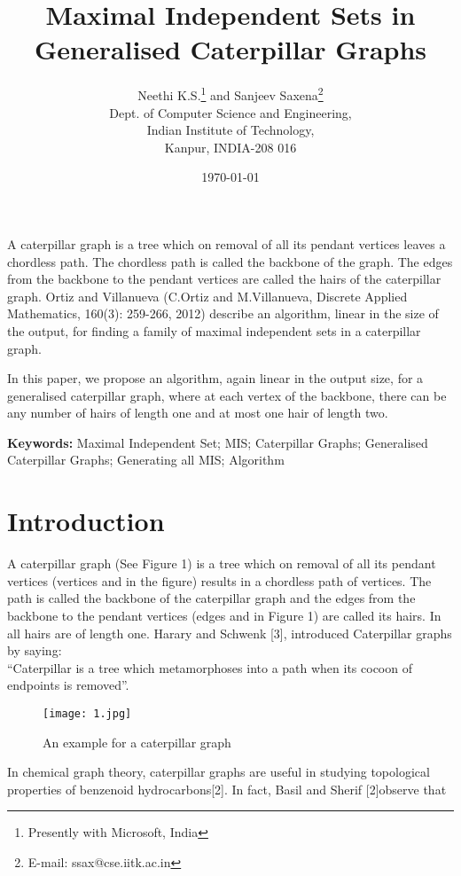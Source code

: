 \documentclass[10pt]{article}
\title{Maximal Independent Sets in Generalised Caterpillar Graphs}
\author{Neethi K.S.\thanks{Presently with Microsoft, India}
{\normalsize{and }} Sanjeev Saxena\thanks{E-mail: ssax@cse.iitk.ac.in}\\
Dept. of Computer Science and Engineering,\\ Indian Institute of
Technology,\\ Kanpur, INDIA-208 016}
\date{\today}
\begin{document}
\maketitle

\subsection*{}


A caterpillar graph is a tree which on removal of all its pendant
vertices leaves a chordless path. The chordless path is called the
backbone of the graph.  The edges from the backbone to the pendant
vertices are called the hairs of the caterpillar graph. Ortiz and
Villanueva (C.Ortiz and M.Villanueva, Discrete Applied Mathematics,
160(3): 259-266, 2012) describe an algorithm, linear in the size of the
output, for finding a family of maximal independent sets in a caterpillar
graph.

In this paper, we propose an algorithm, again linear in the output size,
for a generalised caterpillar graph, where at each vertex of the
backbone, there can be any number of hairs of length one and at most one
hair of length two. 


{\textbf{Keywords:}} Maximal Independent Set; MIS; Caterpillar Graphs;
Generalised Caterpillar Graphs; Generating all MIS; Algorithm 

\section{Introduction}

A caterpillar graph  (See Figure 1) is a tree which on removal of
all its pendant vertices (vertices  and  in the figure) results
in a chordless path  of  vertices. The path
 is called the backbone of the caterpillar graph  and the
edges from the backbone to the pendant vertices (edges  and
 in Figure 1) are called its hairs.  In  all hairs are
of length one. Harary and Schwenk [3], introduced Caterpillar graphs by
saying:\\


``Caterpillar is a tree which metamorphoses into a path when its
cocoon of endpoints is removed''.




\begin{figure}[h]
\centering
\texttt{[image: 1.jpg]}
\caption{An example for a caterpillar graph}
\end{figure}

In chemical graph theory, caterpillar graphs are useful in studying 
topological properties of benzenoid hydrocarbons[2]. In fact, Basil and
Sherif [2]observe that\\
\end{document}
